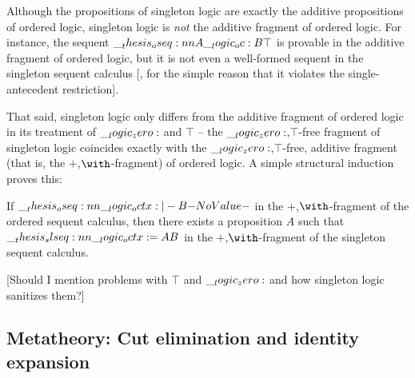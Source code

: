 Although the propositions of singleton logic are exactly the additive propositions of ordered logic, singleton logic is \emph{not} the additive fragment of ordered logic.
For instance, the sequent $\oseq{A \oc B |- \top}$ is provable in the additive fragment of ordered logic, but it
is not even a well-formed sequent in the singleton sequent calculus [, for the simple reason that it violates the single-antecedent restriction].

That said, singleton logic only differs from the additive fragment of ordered logic in its treatment of $\__logic_zero:$ and $\top$ -- the $\__logic_zero:$,$\top$-free fragment of singleton logic coincides exactly with the $\__logic_zero:$,$\top$-free, additive fragment (that is, the $\plus$,$\with$-fragment) of ordered logic.
% 
% 
A simple structural induction proves this:
\begin{theorem}
  If\/ $\oseq{\octx |- B}$ in the $\plus$,$\with$-fragment of the ordered sequent calculus, then there exists a proposition $A$ such that $\slseq{\octx = A |- B}$ in the $\plus$,$\with$-frag\-ment of the singleton sequent calculus.
\end{theorem}

[Should I mention problems with $\top$ and $\__logic_zero:$ and how singleton logic sanitizes them?]


\subsection{Metatheory: Cut elimination and identity expansion}\label{sec:singleton-logic:seq-calc:metatheory}

